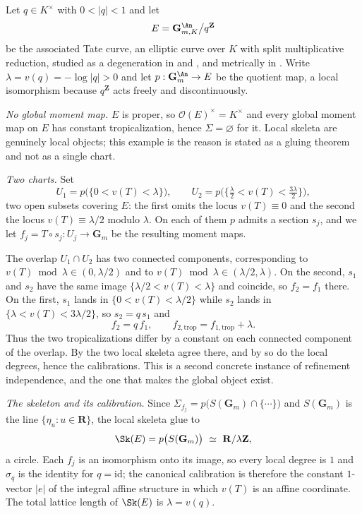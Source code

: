 \begin{example}
\label{ex:trop-tate-curve}
Let $q\in K^\times$ with $0<|q|<1$ and let
\[
 E=\mathbf G_{m,K}^{\An}\big/q^{\mathbf Z}
\]
be the associated Tate curve, an elliptic curve over $K$ with split
multiplicative reduction, studied as a degeneration in
 and , and metrically in
. Write $\lambda=v(q)=-\log|q|>0$ and let
$p:\mathbf G_{m}^{\An}\to E$ be the quotient map, a local isomorphism
because $q^{\mathbf Z}$ acts freely and discontinuously.

\emph{No global moment map.} $E$ is proper, so
$\mathcal O(E)^\times=K^\times$ and every global moment map on $E$ has
constant tropicalization, hence $\Sigma=\varnothing$ for it. Local skeleta
are genuinely local objects; this example is the reason
 is stated as a gluing theorem and not as a
single chart.

\emph{Two charts.} Set
\[
 U_1=p\bigl(\{0<v(T)<\lambda\}\bigr),
 \qquad
 U_2=p\bigl(\{\tfrac\lambda2<v(T)<\tfrac{3\lambda}2\}\bigr),
\]
two open subsets covering $E$: the first omits the locus $v(T)\equiv0$ and
the second the locus $v(T)\equiv\lambda/2$ modulo $\lambda$. On each of them
$p$ admits a section $s_j$, and we let $f_j=T\circ s_j:U_j\to\mathbf G_m$ be
the resulting moment maps.

The overlap $U_1\cap U_2$ has two connected components, corresponding to
$v(T)\bmod\lambda\in(0,\lambda/2)$ and to
$v(T)\bmod\lambda\in(\lambda/2,\lambda)$. On the second, $s_1$ and $s_2$
have the same image $\{\lambda/2<v(T)<\lambda\}$ and coincide, so
$f_2=f_1$ there. On the first, $s_1$ lands in
$\{0<v(T)<\lambda/2\}$ while $s_2$ lands in
$\{\lambda<v(T)<3\lambda/2\}$, so $s_2=q\,s_1$ and
\[
 f_2=q\,f_1,
 \qquad
 f_{2,\mathrm{trop}}=f_{1,\mathrm{trop}}+\lambda .
\]
Thus the two tropicalizations differ by a constant on each connected
component of the overlap. By  the two local
skeleta agree there, and by  so do the
local degrees, hence the calibrations. This is a second concrete instance of
refinement independence, and the one that makes the global object exist.

\emph{The skeleton and its calibration.} Since
$\Sigma_{f_j}=p\bigl(S(\mathbf G_m)\cap\{\cdots\}\bigr)$ and $S(\mathbf G_m)$
is the line $\{\eta_u:u\in\mathbf R\}$, the local skeleta glue to
\[
 \Sk(E)=p\bigl(S(\mathbf G_m)\bigr)\ \simeq\ \mathbf R/\lambda\mathbf Z,
\]
a circle. Each $f_j$ is an isomorphism onto its image, so every local degree
is $1$ and $\sigma_{q}$ is the identity for $q=\mathrm{id}$; the canonical
calibration is therefore the constant $1$-vector $|e|$ of the integral
affine structure in which $v(T)$ is an affine coordinate. The total lattice
length of $\Sk(E)$ is $\lambda=v(q)$.


\end{example}
